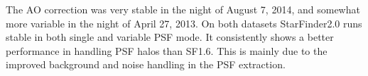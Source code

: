 The AO correction was very stable in the night of August 7, 2014, and somewhat more variable in the night of April 27, 2013. On both datasets StarFinder2.0 runs stable in both single and variable PSF mode. It consistently shows a better performance in handling PSF halos than SF1.6. This is mainly due to the improved background and noise handling in the PSF extraction.
  